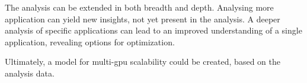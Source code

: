 The analysis can be extended in both breadth and depth. Analysing more application can yield new insights, not yet present
in the analysis. A deeper analysis of specific applications can lead to an improved understanding of a single application,
revealing options for optimization.

Ultimately, a model for multi-gpu scalability could be created, based on the analysis data.